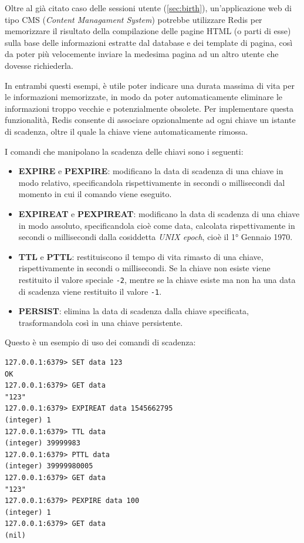 Oltre al già citato caso delle sessioni utente (\ref{sec:birth}), un'applicazione web di tipo CMS
(\emph{Content Managament System}) potrebbe utilizzare Redis per memorizzare il risultato della
compilazione delle pagine HTML (o parti di esse) sulla base delle informazioni estratte dal database
e dei template di pagina, così da poter più velocemente inviare la medesima pagina ad un altro
utente che dovesse richiederla.

In entrambi questi esempi, è utile poter indicare una durata massima di vita per le informazioni
memorizzate, in modo da poter automaticamente eliminare le informazioni troppo vecchie e
potenzialmente obsolete. Per implementare questa funzionalità, Redis consente di associare
opzionalmente ad ogni chiave un istante di scadenza, oltre il quale la chiave viene automaticamente
rimossa.

I comandi che manipolano la scadenza delle chiavi sono i seguenti:

\begin{itemize}
	\medskip
	\item \textbf{EXPIRE} e \textbf{PEXPIRE}: modificano la data di scadenza di una chiave in
	modo relativo, specificandola rispettivamente in secondi o millisecondi dal momento in cui 
	il comando viene eseguito.
	\item \textbf{EXPIREAT} e \textbf{PEXPIREAT}: modificano la data di scadenza di una chiave
	in modo assoluto, specificandola cioè come data, calcolata rispettivamente in secondi o 
	millisecondi dalla cosiddetta \emph{UNIX epoch}, cioè il 1° Gennaio 1970.
	\item \textbf{TTL} e \textbf{PTTL}: restituiscono il tempo di vita rimasto di una chiave,
	rispettivamente in secondi o millisecondi. Se la chiave non esiste viene restituito il
	valore speciale \verb|-2|, mentre se la chiave esiste ma non ha una data di scadenza viene
	restituito il valore \verb|-1|.
	\item \textbf{PERSIST}: elimina la data di scadenza dalla chiave specificata, trasformandola
	così in una chiave persistente.
\end{itemize}

Questo è un esempio di uso dei comandi di scadenza:

\medskip
\begin{lstlisting}
127.0.0.1:6379> SET data 123
OK
127.0.0.1:6379> GET data
"123"
127.0.0.1:6379> EXPIREAT data 1545662795
(integer) 1
127.0.0.1:6379> TTL data
(integer) 39999983
127.0.0.1:6379> PTTL data
(integer) 39999980005
127.0.0.1:6379> GET data
"123"
127.0.0.1:6379> PEXPIRE data 100
(integer) 1
127.0.0.1:6379> GET data
(nil)
\end{lstlisting}

